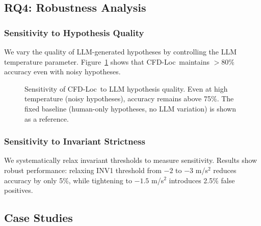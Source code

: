 \documentclass[conference]{IEEEtran}
\theoremstyle{plain}
\newcommand{\methodname}{CFD-Loc}
\begin{document}
\subsection{RQ4: Robustness Analysis}

\subsubsection{Sensitivity to Hypothesis Quality}

We vary the quality of LLM-generated hypotheses by controlling the LLM temperature parameter. Figure~\ref{fig:sensitivity} shows that \methodname\ maintains $>80\%$ accuracy even with noisy hypotheses.

\begin{figure}[h]
\centering
{}
\caption{Sensitivity of \methodname\ to LLM hypothesis quality. Even at high temperature (noisy hypotheses), accuracy remains above 75\%. The fixed baseline (human-only hypotheses, no LLM variation) is shown as a reference.}
\label{fig:sensitivity}
\end{figure}

\subsubsection{Sensitivity to Invariant Strictness}

We systematically relax invariant thresholds to measure sensitivity. Results show robust performance: relaxing INV1 threshold from $-2$ to $-3$ m/s$^2$ reduces accuracy by only 5\%, while tightening to $-1.5$ m/s$^2$ introduces 2.5\% false positives.

\subsection{Case Studies}
\end{document}

